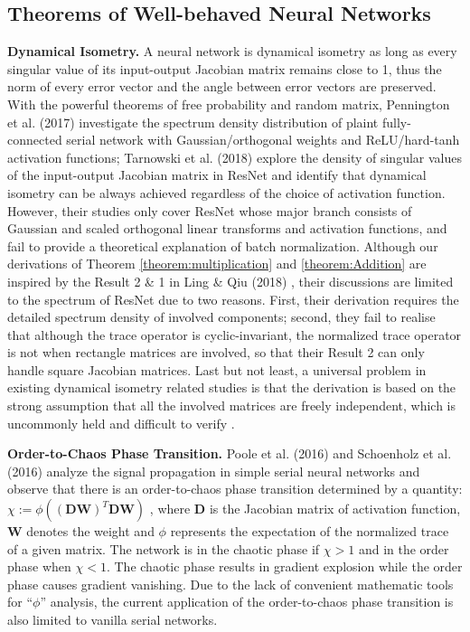 \documentclass[10pt,journal,compsoc]{IEEEtran}
\begin{document}
\subsection{Theorems of Well-behaved Neural Networks}

\hspace*{14pt}\textbf{Dynamical Isometry.} A neural network is dynamical isometry as long as every singular value of its input-output Jacobian matrix remains close to 1, thus the norm of every error vector and the angle between error vectors are preserved. With the powerful theorems of free probability and random matrix, Pennington et al. (2017) \cite{pennington2017resurrecting} investigate the spectrum density distribution of plaint fully-connected serial network with Gaussian/orthogonal weights and ReLU/hard-tanh activation functions; Tarnowski et al. (2018) \cite{tarnowski2018dynamical} explore the density of singular values of the input-output Jacobian matrix in ResNet and identify that dynamical isometry can be always achieved regardless of the choice of activation function. However, their studies only cover ResNet whose major branch consists of Gaussian and scaled orthogonal linear transforms and activation functions, and fail to provide a theoretical explanation of batch normalization.  Although our derivations of Theorem \ref{theorem:multiplication} and \ref{theorem:Addition} are inspired by the Result 2 \& 1 in Ling \& Qiu (2018) \cite{ling2018spectrum}, their discussions are limited to the spectrum of ResNet due to two reasons. First, their derivation requires the detailed spectrum density of involved components; second, they fail to realise that although the trace operator is cyclic-invariant, the normalized trace operator is not when rectangle matrices are involved, so that their Result 2 can only handle square Jacobian matrices. Last but not least, a universal problem in existing dynamical isometry related studies is that the derivation is based on the strong assumption that all the involved matrices are freely independent, which is uncommonly held and difficult to verify \cite{chen2012partial}.

\textbf{Order-to-Chaos Phase Transition.} Poole et al. (2016) \cite{poole2016exponential} and Schoenholz et al. (2016) \cite{schoenholz2016deep} analyze the signal propagation in simple serial neural networks and observe that there is an order-to-chaos phase transition determined by a quantity: $\chi :=\phi\left(\left(\mathbf{DW}\right)^T\mathbf{DW}\right)$ \cite{pennington2017resurrecting}, where $\mathbf{D}$ is the Jacobian matrix of activation function, $\mathbf{W}$ denotes the weight and $\phi$ represents the expectation of the normalized trace of a given matrix. The network is in the chaotic phase if $\chi>1$ and in the order phase when $\chi<1$. The chaotic phase results in gradient explosion while the order phase causes gradient vanishing. Due to the lack of convenient mathematic tools for ``$\phi$'' analysis, the current application of the order-to-chaos phase transition is also limited to vanilla serial networks.
\end{document}
